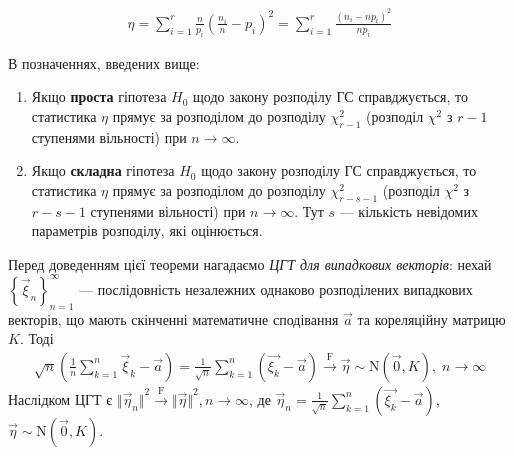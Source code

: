 \begin{gather*}
    \eta = \sum_{i=1}^r \frac{n}{p_i}\left(\frac{n_i}{n} - p_i \right)^2 = \sum_{i=1}^r \frac{\left(n_i - np_i\right)^2}{np_i}
\end{gather*}
\begin{theorem*}
    В позначеннях, введених вище:
    \begin{enumerate}
        \item Якщо \textbf{проста} гіпотеза $H_0$ щодо закону розподілу ГС справджується,
        то статистика $\eta$ прямує за розподілом до розподілу $\chi^2_{r-1}$ (розподіл $\chi^2$ з $r-1$ ступенями вільності) при $n\to\infty$.
        \item Якщо \textbf{складна} гіпотеза $H_0$ щодо закону розподілу ГС справджується,
        то статистика $\eta$ прямує за розподілом до розподілу $\chi^2_{r-s-1}$ (розподіл $\chi^2$ з $r-s-1$ ступенями вільності) при $n\to\infty$. Тут $s$ --- кількість
        невідомих параметрів розподілу, які оцінюється.
    \end{enumerate}    
\end{theorem*}
Перед доведенням цієї теореми нагадаємо \emph{ЦГТ для випадкових векторів}: нехай $\left\{ \vec{\xi}_n\right\}_{n=1}^{\infty}$ --- послідовність незалежних однаково розподілених випадкових векторів, що мають скінченні
математичне сподівання $\vec{a}$ та кореляційну матрицю $K$. Тоді
\begin{gather}\label{th:clt_vect}
    \sqrt{n}\left( \frac{1}{n} \sum\limits_{k=1}^n \vec{\xi}_k - \vec{a}\right) = 
    \frac{1}{\sqrt{n}} \sum\limits_{k=1}^n \left( \vec{\xi_k} - \vec{a}\right) \overset{\mathrm{F}}{\longrightarrow} \vec{\eta} \sim \mathrm{N}\left(\vec{0}, K\right), \; n\to\infty
\end{gather}
Наслідком ЦГТ є ${\Vert \vec{\eta}_n \Vert}^2 \overset{\mathrm{F}}{\longrightarrow} {\Vert \vec{\eta} \Vert}^2, n\to\infty$, де
$\vec{\eta}_n = \frac{1}{\sqrt{n}} \sum\limits_{k=1}^n \left( \vec{\xi_k} - \vec{a}\right)$, $\vec{\eta} \sim \mathrm{N}\left(\vec{0}, K\right)$.

